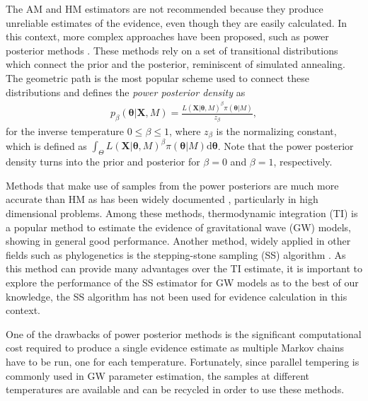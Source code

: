\documentclass[aps,reprint,amsmath,amssymb,showpacs,showkeys]{revtex4-1}%
\begin{document}
The AM and HM estimators are not recommended because they produce unreliable estimates of the evidence, even though they are easily calculated.   In this context, more complex approaches have been proposed, such as power posterior methods \cite{Xie:Lewis:Fan:Kuo:Chen:2011, Lartillot:Philippe:2006, Friel:2008, Neal:2001}.  These methods rely on a set of transitional distributions which connect the prior and the posterior, reminiscent of simulated annealing.  The geometric path is the most popular scheme used to connect these distributions and defines the \textit{power posterior density} as
\begin{align}\label{eq:powerposterior}
p_{\beta}(\bm{\theta}|\bm{X}, M) = \frac{L(\bm{X}|\bm{\theta},M)^{\beta}\pi(\bm{\theta}|M)}{z_{\beta}},
\end{align}
for the inverse temperature $0\leq\beta\leq 1$, where $z_{\beta}$ is the normalizing constant, which is defined as $\int_{\Theta} L(\bm{X}|\bm{\theta},M)^{\beta}\pi(\bm{\theta}|M) \text{d}\bm{\theta}$. Note that the power posterior density turns into the prior and posterior for $\beta = 0$ and $\beta = 1$, respectively.   

Methods  that make use of samples from the power posteriors are much more accurate than HM as has been widely documented \citep{Lartillot:Philippe:2006, Newton:Raftery:1994, Xie:Lewis:Fan:Kuo:Chen:2011}, particularly in high dimensional problems.  Among these methods, thermodynamic integration (TI) \citep{Lartillot:Philippe:2006} is a popular method to estimate the  evidence  of gravitational wave (GW) models, showing in general good performance.  Another method, widely applied in other fields such as phylogenetics is the stepping-stone sampling (SS) algorithm \citep{Xie:Lewis:Fan:Kuo:Chen:2011}.  As this method
can provide many advantages over the TI estimate, it is important to explore the performance of  the SS estimator  for GW models as  to the best of our knowledge,  the SS algorithm has not been used for evidence calculation in this context.

One of the drawbacks of power posterior methods is the significant computational cost required to produce a single evidence estimate as 
multiple Markov chains have to be run, one for each temperature.  Fortunately, since  parallel tempering is commonly used in GW parameter estimation, the samples at different temperatures are available and can be recycled in order to use these methods.
\end{document}
